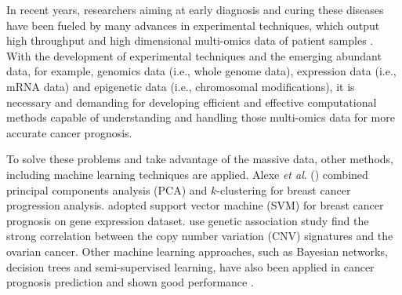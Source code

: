 \documentclass{article}
\begin{document}
In recent years, researchers aiming at early diagnosis and curing these diseases have been fueled by many advances in experimental techniques, which output high throughput and high dimensional multi-omics data of patient samples \citep{wooster2003breast,goossens2015cancer}. With the development of experimental techniques and the emerging abundant data, for example, genomics data (i.e., whole genome data), expression data (i.e., mRNA data) and epigenetic data (i.e., chromosomal modifications), it is necessary and demanding for developing efficient and effective computational methods capable of understanding and handling those multi-omics data for more accurate cancer prognosis\citep{zhu2020application}.


To solve these problems and take advantage of the massive data, other methods, including machine learning techniques are applied. Alexe \textit{et al}. (\citealp{alexe2007analysis}) combined principal components analysis (PCA) and $k$-clustering for breast cancer progression analysis. \citealp{xu2012gene} adopted support vector machine (SVM) for breast cancer prognosis on gene expression dataset. \citealp{graf2021association} use genetic association study find the strong correlation between the copy number variation (CNV) signatures and the ovarian cancer. Other machine learning approaches, such as Bayesian networks, decision trees and semi-supervised learning, have also been applied in cancer prognosis prediction and shown good performance \citep{kourou2015machine}.
\end{document}
